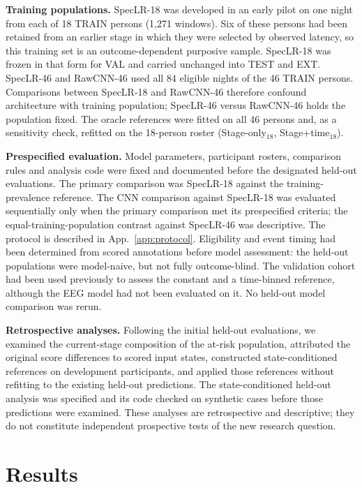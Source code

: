 \documentclass{article}
\begin{document}
\textbf{Training populations.} SpecLR-18 was developed in an early pilot on one night from each of 18 TRAIN persons (1{,}271 windows). Six of these persons had been retained from an earlier stage in which they were selected by observed latency, so this training set is an outcome-dependent purposive sample. SpecLR-18 was frozen in that form for VAL and carried unchanged into TEST and EXT. SpecLR-46 and RawCNN-46 used all 84 eligible nights of the 46 TRAIN persons. Comparisons between SpecLR-18 and RawCNN-46 therefore confound architecture with training population; SpecLR-46 versus RawCNN-46 holds the population fixed. The oracle references were fitted on all 46 persons and, as a sensitivity check, refitted on the 18-person roster (Stage-only$_{18}$, Stage+time$_{18}$).

\textbf{Prespecified evaluation.} Model parameters, participant rosters, comparison rules and analysis code were fixed and documented before the designated held-out evaluations. The primary comparison was SpecLR-18 against the training-prevalence reference. The CNN comparison against SpecLR-18 was evaluated sequentially only when the primary comparison met its prespecified criteria; the equal-training-population contrast against SpecLR-46 was descriptive. The protocol is described in App.~\ref{app:protocol}. Eligibility and event timing had been determined from scored annotations before model assessment: the held-out populations were model-naive, but not fully outcome-blind. The validation cohort had been used previously to assess the constant and a time-binned reference, although the EEG model had not been evaluated on it. No held-out model comparison was rerun.

\textbf{Retrospective analyses.} Following the initial held-out evaluations, we examined the current-stage composition of the at-risk population, attributed the original score differences to scored input states, constructed state-conditioned references on development participants, and applied those references without refitting to the existing held-out predictions. The state-conditioned held-out analysis was specified and its code checked on synthetic cases before those predictions were examined. These analyses are retrospective and descriptive; they do not constitute independent prospective tests of the new research question.



\section{Results}
\label{sec:results}
\end{document}
